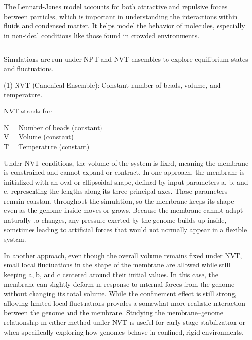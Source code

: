 \documentclass[12pt]{article}
\begin{document}
\begin{flushleft}
The Lennard-Jones model accounts for both attractive and repulsive forces between particles, which is important in understanding the interactions within fluids and condensed matter. It helps model the behavior of molecules, especially in non-ideal conditions like those found in crowded environments. 

\subsection*{}
Simulations are run under NPT and NVT ensembles to explore equilibrium states and fluctuations.

(1) NVT (Canonical Ensemble): Constant number of beads, volume, and temperature.
   
  

\indent\indent NVT stands for:

 \indent\indent\indent  N = Number of beads (constant)\\

 \indent\indent\indent  V = Volume (constant)\\

 \indent\indent\indent  T = Temperature (constant)

Under NVT conditions, the volume of the system is fixed, meaning the membrane is constrained and cannot expand or contract. In one approach, the membrane is initialized with an oval or ellipsoidal shape, defined by input parameters a, b, and c, representing the lengths along its three principal axes. These parameters remain constant throughout the simulation, so the membrane keeps its shape even as the genome inside moves or grows. Because the membrane cannot adapt naturally to changes, any pressure exerted by the genome builds up inside, sometimes leading to artificial forces that would not normally appear in a flexible system.

In another approach, even though the overall volume remains fixed under NVT, small local fluctuations in the shape of the membrane are allowed while still keeping a, b, and c centered around their initial values. In this case, the membrane can slightly deform in response to internal forces from the genome without changing its total volume. While the confinement effect is still strong, allowing limited local fluctuations provides a somewhat more realistic interaction between the genome and the membrane. Studying the membrane–genome relationship in either method under NVT is useful for early-stage stabilization or when specifically exploring how genomes behave in confined, rigid environments.


\end{flushleft}
\end{document}
